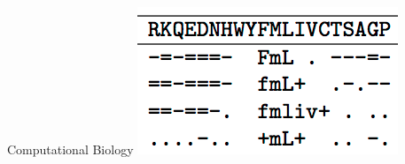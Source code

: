 \documentclass[xcolor=dvipsnames]{beamer}
\begin{document}
{\begin{columns}
   \begin{block}{Computational Biology}
     \centering
     \includegraphics[width=0.4\linewidth]{general_figures/protein} \\
     \small
     \cite{nguyen-13b,hu-13:coalescent}
   \end{block}


\end{columns}

}
\end{document}
